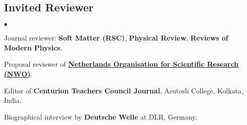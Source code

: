 \documentclass[margin,line]{res}
\newenvironment{list2}{
  \begin{list}{$\bullet$}{%
      \setlength{\itemsep}{0in}
      \setlength{\parsep}{0in} \setlength{\parskip}{0in}
      \setlength{\topsep}{0in} \setlength{\partopsep}{0in} 
      \setlength{\leftmargin}{0.2in}}}{\end{list}}
\begin{document}
\begin{resume}
\section{\sc Invited Reviewer}
\begin{list2}
\item Journal reviewer: {\bf Soft Matter (RSC)}, {\bf Physical Review}, {\bf Reviews of Modern Physics}. 
\item Proposal reviewer of {\bf \href{https://www.nwo.nl/en}{Netherlands Organisation for Scientific Research (NWO)}}. 
\item Editor of {\bf Centurion Teachers Council Journal}, Asutosh College, Kolkata, India.
\item Biographical interview by {\bf \textsf{Deutsche Welle}} at DLR, Germany. 
\end{list2}


\end{resume}
\end{document}
